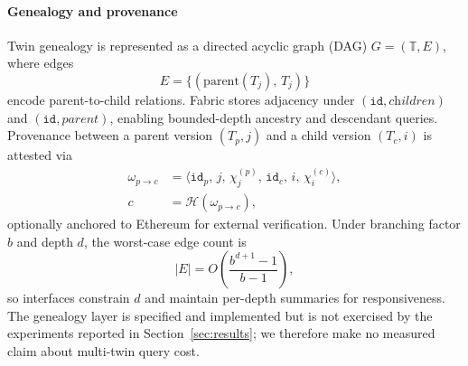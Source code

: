 \documentclass[final,5p,times,twocolumn]{elsarticle}
\begin{document}
\paragraph*{\textbf{Genealogy and provenance}}
Twin genealogy is represented as a directed acyclic graph (DAG) $G=(\mathbb{T},E)$, where edges
\begin{equation}
  E = \big\{ (\mathrm{parent}(T_j),\,T_j) \big\}
  \label{eq:dag_edges}
\end{equation}
encode parent-to-child relations. Fabric stores adjacency under $(\texttt{id},\textit{children})$ and $(\texttt{id},\textit{parent})$, enabling bounded-depth ancestry and descendant queries. Provenance between a parent version $(T_p,j)$ and a child version $(T_c,i)$ is attested via
\begin{subequations}
\begin{align}
  \omega_{p\to c} &= \langle \texttt{id}_p,\,j,\,\chi_j^{(p)},\,\texttt{id}_c,\,i,\,\chi_i^{(c)}\rangle, \label{eq:witness}\\
  c &= \mathcal{H}(\omega_{p\to c}), \label{eq:witness_hash}
\end{align}
\end{subequations}
optionally anchored to Ethereum for external verification. Under branching factor $b$ and depth $d$, the worst-case edge count is
\begin{equation}
  |E| = O\!\left(\frac{b^{d+1}-1}{b-1}\right),
  \label{eq:edge_bound}
\end{equation}
so interfaces constrain $d$ and maintain per-depth summaries for responsiveness. The genealogy layer is specified and implemented but is not exercised by the experiments reported in Section~\ref{sec:results}; we therefore make no measured claim about multi-twin query cost.
\end{document}
